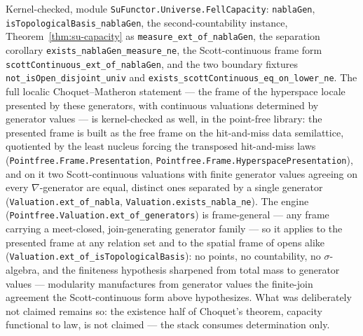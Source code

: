 \begin{remark}
\label{rem:su-capacity-mechanized}
\sloppy
Kernel-checked, module \texttt{SuFunctor.Universe.FellCapacity}:
\texttt{nablaGen}, \texttt{isTopologicalBasis\_nablaGen}, the
second-countability instance,
Theorem~\ref{thm:su-capacity} as \texttt{measure\_ext\_of\_nablaGen},
the separation corollary \texttt{exists\_nablaGen\_measure\_ne}, the
Scott-continuous frame form
\texttt{scottContinuous\_ext\_of\_nablaGen}, and the two boundary
fixtures \texttt{not\_isOpen\_disjoint\_univ} and
\texttt{exists\_scottContinuous\_eq\_on\_lower\_ne}. The full localic
Choquet--Matheron statement --- the frame of the hyperspace locale
presented by these generators, with continuous valuations determined
by generator values --- is kernel-checked as well, in the point-free
library: the presented frame is built as the free frame on the
hit-and-miss data semilattice, quotiented by the least nucleus
forcing the transposed hit-and-miss laws
(\texttt{Pointfree.Frame.Presentation},
\texttt{Pointfree.Frame.HyperspacePresentation}), and on it two
Scott-continuous valuations with finite generator values agreeing on
every $\nabla$-generator are equal, distinct ones separated by a
single generator (\texttt{Valuation.ext\_of\_nabla},
\texttt{Valuation.exists\_nabla\_ne}). The engine
(\texttt{Pointfree.Valuation.ext\_of\_generators}) is frame-general
--- any frame carrying a meet-closed, join-generating generator
family --- so it applies to the presented frame at any relation set
and to the spatial frame of opens alike
(\texttt{Valuation.ext\_of\_isTopologicalBasis}): no points, no
countability, no $\sigma$-algebra, and the finiteness hypothesis
sharpened from total mass to generator values --- modularity
manufactures from generator values the finite-join agreement the
Scott-continuous form above hypothesizes. What was deliberately not
claimed remains so: the existence half of Choquet's theorem,
capacity functional to law, is not claimed --- the stack consumes
determination only.
\end{remark}

